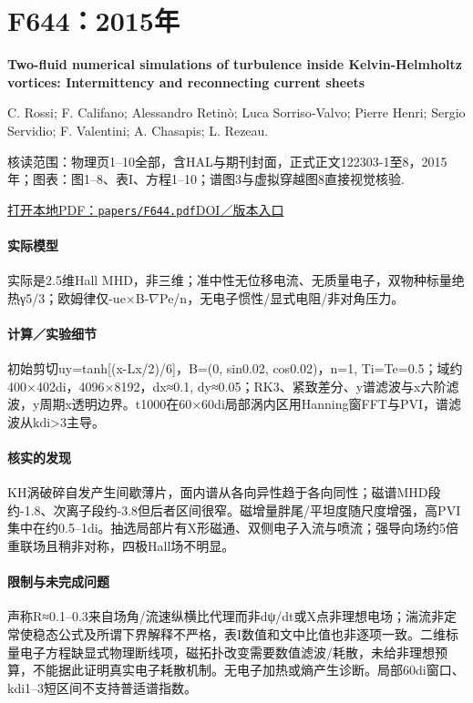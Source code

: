 \section{F644：2015年}\label{paper:F644}

\textbf{Two-fluid numerical simulations of turbulence inside Kelvin-Helmholtz vortices: Intermittency and reconnecting current sheets}\citep{F644}\

C. Rossi;  F. Califano;  Alessandro Retinò;  Luca Sorriso‐Valvo;  Pierre Henri;  Sergio Servidio;  F. Valentini;  A. Chasapis;  L. Rezeau.

\textsf{核读范围：}物理页1–10全部，含HAL与期刊封面，正式正文122303-1至8，2015年；\textsf{图表：}图1–8、表I、方程1–10；谱图3与虚拟穿越图8直接视觉核验.

\href{run:papers/F644.pdf}{打开本地PDF：\texttt{papers/F644.pdf}}\quad\href{https://doi.org/10.1063/1.4936795}{DOI／版本入口}

\paragraph{实际模型}实际是2.5维Hall MHD，非三维；准中性无位移电流、无质量电子，双物种标量绝热γ5/3；欧姆律仅-ue×B-\ensuremath{\nabla}Pe/n，无电子惯性/显式电阻/非对角压力。

\paragraph{计算／实验细节}初始剪切uy=tanh[(x-Lx/2)/6]，B=(0, sin0.02, cos0.02)，n=1, Ti=Te=0.5；域约400×402di，4096×8192，dx≈0.1, dy≈0.05；RK3、紧致差分、y谱滤波与x六阶滤波，y周期x透明边界。t1000在60×60di局部涡内区用Hanning窗FFT与PVI，谱滤波从kdi>3主导。

\paragraph{核实的发现}KH涡破碎自发产生间歇薄片，面内谱从各向异性趋于各向同性；磁谱MHD段约-1.8、次离子段约-3.8但后者区间很窄。磁增量胖尾/平坦度随尺度增强，高PVI集中在约0.5–1di。抽选局部片有X形磁通、双侧电子入流与喷流；强导向场约5倍重联场且稍非对称，四极Hall场不明显。

\paragraph{限制与未完成问题}声称R≈0.1–0.3来自场角/流速纵横比代理而非dψ/dt或X点非理想电场；湍流非定常使稳态公式及所谓下界解释不严格，表I数值和文中比值也非逐项一致。二维标量电子方程缺显式物理断线项，磁拓扑改变需要数值滤波/耗散，未给非理想预算，不能据此证明真实电子耗散机制。无电子加热或熵产生诊断。局部60di窗口、kdi1–3短区间不支持普适谱指数。

